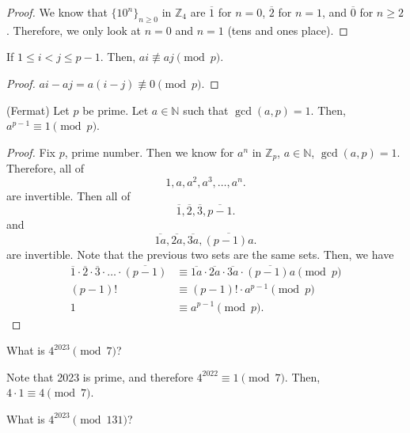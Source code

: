 \documentclass[a4paper]{article}
\begin{document}
\begin{proof}
	We know that \( \{10^n\} _{n\ge 0}  \) in \( \mathbb{Z}_{4} \) are \( \overline{1}  \) for \( n=0 \), \( \overline{2}  \) for \( n=1 \), and \( \overline{0}  \) for \( n\ge 2   \). Therefore, we only look at \( n=0 \) and \( n=1 \) (tens and ones place).
\end{proof} 

\begin{lemma}
	If \( 1 \le i < j \le p-1 \). Then, \( ai \not\equiv aj \pmod p \).
\end{lemma}

\begin{proof}
	\( ai-aj = a(i-j) \not\equiv 0 \pmod p \). 
\end{proof}

\begin{theorem}
	(Fermat) Let \( p \) be prime. Let \( a \in \mathbb{N} \) such that \( \gcd(a,p)=1\). Then, \( a^{p-1}\equiv 1 \pmod p \).
\end{theorem}

\begin{proof}
	Fix \( p \), prime number. Then we know for \( a^n \) in \( \mathbb{Z}_p \), \( a\in \mathbb{N} \),  \( \gcd(a,p)=1 \). Therefore, all of \[
		1, a, a^2, a^3, \ldots , a^{n}
	.\] are invertible. Then all of \[
		\overline{1}, \overline{2}, \overline{3}, \overline{p-1} 
	.\] and \[
		\overline{1a}, \overline{2a}, \overline{3a}, \overline{(p-1)a} 
	.\] are invertible. Note that the previous two sets are the same sets. Then, we have
	\begin{align*}
		\overline{1}\cdot \overline{2}\cdot \overline{3}\cdot \ldots \cdot \overline{(p-1)} &\equiv \overline{1a}\cdot \overline{2a}\cdot \overline{3a}\cdot \overline{(p-1)a}     \pmod p \\
		(p-1)! &\equiv (p-1)! \cdot a^{p-1}  \pmod p \\
						1 &\equiv a^{p-1} \pmod p
	.\end{align*}
\end{proof}

\begin{eg}
	What is \( 4^{2023} \pmod 7  \)?
\end{eg}

Note that 2023 is prime, and therefore \( 4^{2022}\equiv 1 \pmod 7   \). Then, \( 4\cdot 1 \equiv 4 \pmod 7 \).

\begin{eg}
	What is \( 4^{2023} \pmod {131} \)?
\end{eg}
\end{document}
